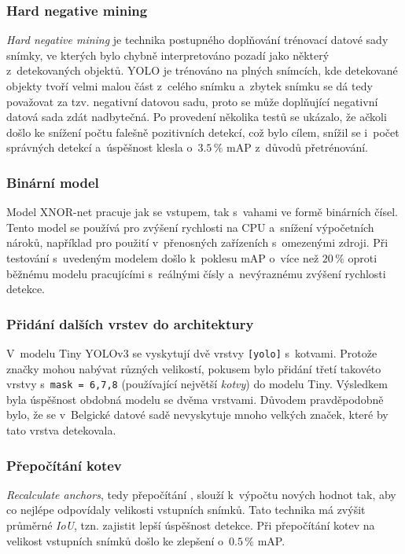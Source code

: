 \subsubsection*{Hard negative mining}
\emph{Hard negative mining} je technika postupného doplňování trénovací datové sady snímky, ve kterých bylo chybně interpretováno pozadí jako některý z~detekovaných objektů.
YOLO je trénováno na plných snímcích, kde detekované objekty tvoří velmi malou část z~celého snímku a~zbytek snímku se dá tedy považovat za tzv. negativní datovou sadu, proto se může doplňující negativní datová sada zdát nadbytečná.
Po provedení několika testů se ukázalo, že ačkoli došlo ke snížení počtu falešně pozitivních detekcí, což bylo cílem, snížil se i~počet správných detekcí a~úspěšnost klesla o~$3.5\,\%$ mAP z~důvodů přetrénování.

\subsubsection*{Binární model}
Model XNOR-net pracuje jak se vstupem, tak s~vahami ve formě binárních čísel. Tento model se používá pro zvýšení rychlosti na CPU a~snížení výpočetních nároků, například pro použití v~přenosných zařízeních s~omezenými zdroji. Při testování s~uvedeným modelem došlo k~poklesu mAP o~více než $20\,\%$ oproti běžnému modelu pracujícími s~reálnými čísly a~nevýraznému zvýšení rychlosti detekce.

\subsubsection*{Přidání dalších vrstev do architektury}
V~modelu Tiny YOLOv3 se vyskytují dvě vrstvy \texttt{[yolo]} s~kotvami. Protože značky mohou nabývat různých velikostí, pokusem bylo přidání třetí takovéto vrstvy s~\texttt{mask = 6,7,8} (používající největší \emph{kotvy}) do modelu Tiny. Výsledkem byla úspěšnost obdobná modelu se dvěma vrstvami. Důvodem pravděpodobně bylo, že se v~Belgické datové sadě nevyskytuje mnoho velkých značek, které by tato vrstva detekovala.

\subsubsection*{Přepočítání kotev}
\emph{Recalculate anchors}, tedy přepočítání , slouží k~výpočtu nových hodnot tak, aby co nejlépe odpovídaly velikosti vstupních snímků. Tato technika má zvýšit průměrné \emph{IoU}, tzn. zajistit lepší úspěšnost detekce. Při přepočítání kotev na velikost vstupních snímků došlo ke zlepšení o~$0.5\,\%$ mAP.

